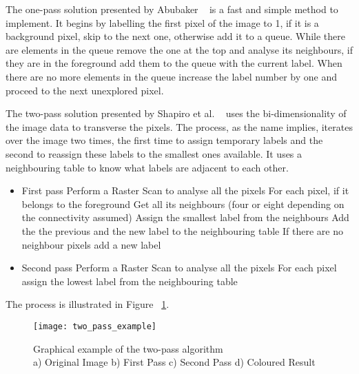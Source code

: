 The one-pass solution presented by Abubaker ~\cite{abubaker_one_2007} is a fast and simple method to implement. It begins by labelling the first pixel of the image to 1, if it is a background pixel, skip to the next one, otherwise add it to a queue. While there are elements in the queue remove the one at the top and analyse its neighbours, if they are in the foreground add them to the queue with the current label. When there are no more elements in the queue increase the label number by one and proceed to the next unexplored pixel.

The two-pass solution presented by Shapiro et al. ~\cite{shapiro_computer_2001} uses the bi-dimensionality of the image data to transverse the pixels. The process, as the name implies, iterates over the image two times, the first time to assign temporary labels and the second to reassign these labels to the smallest ones available. It uses a neighbouring table to know what labels are adjacent to each other.

\begin{itemize}
	\item First pass
		\subitem Perform a Raster Scan to analyse all the pixels
		\subitem For each pixel, if it belongs to the foreground
			\subsubitem Get all its neighbours (four or eight depending on the connectivity assumed)
				\subsubitem Assign the smallest label from the neighbours
				\subsubitem Add the the previous and the new label to the neighbouring table
			\subsubitem If there are no neighbour pixels add a new label
	\item Second pass
		\subitem Perform a Raster Scan to analyse all the pixels
		\subitem For each pixel assign the lowest label from the neighbouring table
\end{itemize}

The process is illustrated in Figure ~\ref{fig:two_pass_example}.

\begin{figure}[h]
  \begin{center}
    \leavevmode
    \texttt{[image: two\_pass\_example]}
    \captionsetup{justification=centering}
    \caption{Graphical example of the two-pass algorithm ~\cite{wikipedia_connected_2017}\\a) Original Image b) First Pass c) Second Pass d) Coloured Result}
    \label{fig:two_pass_example}
  \end{center}
\end{figure}

